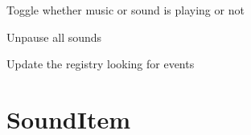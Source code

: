 \documentclass[letterpaper,10pt,english]{sphinxmanual}
\begin{document}
\begin{fulllineitems}
\begin{fulllineitems}
\end{fulllineitems}


\begin{fulllineitems}
\label{sound:serge.sound.AudioRegistry.toggle}
Toggle whether music or sound is playing or not

\end{fulllineitems}


\begin{fulllineitems}
\label{sound:serge.sound.AudioRegistry.unpause}
Unpause all sounds

\end{fulllineitems}


\begin{fulllineitems}
\label{sound:serge.sound.AudioRegistry.update}
Update the registry looking for events

\end{fulllineitems}


\end{fulllineitems}



\section{SoundItem}
\label{sound:sounditem}
\end{document}
